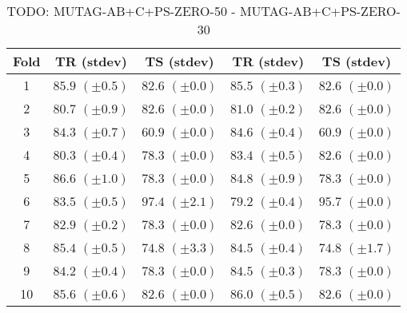 \documentclass[10pt,a4paper]{book}
\begin{document}
\begin{table}[tbph]
\caption{TODO: MUTAG-AB+C+PS-ZERO-50 - MUTAG-AB+C+PS-ZERO-30}
\label{TODO}
\centering
\begin{tabular}{c*{4}{c}}
\toprule
Fold & TR (stdev) & TS (stdev) & TR (stdev) & TS (stdev)\\
\midrule
1 & $85.9$ $(\pm 0.5)$ & $82.6$ $(\pm 0.0)$ & $85.5$ $(\pm 0.3)$ & $82.6$ $(\pm 0.0)$\\
2 & $80.7$ $(\pm 0.9)$ & $82.6$ $(\pm 0.0)$ & $81.0$ $(\pm 0.2)$ & $82.6$ $(\pm 0.0)$\\
3 & $84.3$ $(\pm 0.7)$ & $60.9$ $(\pm 0.0)$ & $84.6$ $(\pm 0.4)$ & $60.9$ $(\pm 0.0)$\\
4 & $80.3$ $(\pm 0.4)$ & $78.3$ $(\pm 0.0)$ & $83.4$ $(\pm 0.5)$ & $82.6$ $(\pm 0.0)$\\
5 & $86.6$ $(\pm 1.0)$ & $78.3$ $(\pm 0.0)$ & $84.8$ $(\pm 0.9)$ & $78.3$ $(\pm 0.0)$\\
6 & $83.5$ $(\pm 0.5)$ & $97.4$ $(\pm 2.1)$ & $79.2$ $(\pm 0.4)$ & $95.7$ $(\pm 0.0)$\\
7 & $82.9$ $(\pm 0.2)$ & $78.3$ $(\pm 0.0)$ & $82.6$ $(\pm 0.0)$ & $78.3$ $(\pm 0.0)$\\
8 & $85.4$ $(\pm 0.5)$ & $74.8$ $(\pm 3.3)$ & $84.5$ $(\pm 0.4)$ & $74.8$ $(\pm 1.7)$\\
9 & $84.2$ $(\pm 0.4)$ & $78.3$ $(\pm 0.0)$ & $84.5$ $(\pm 0.3)$ & $78.3$ $(\pm 0.0)$\\
10 & $85.6$ $(\pm 0.6)$ & $82.6$ $(\pm 0.0)$ & $86.0$ $(\pm 0.5)$ & $82.6$ $(\pm 0.0)$\\
\bottomrule
\end{tabular}
\end{table}


\end{document}
